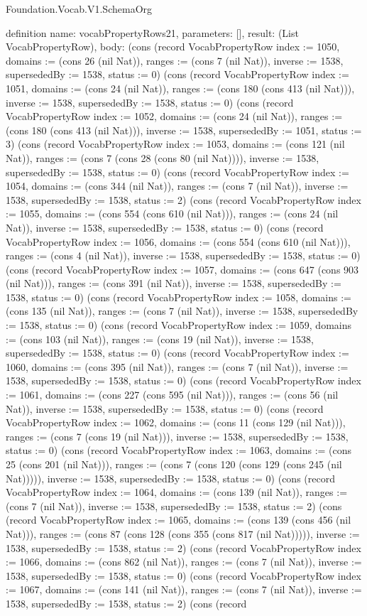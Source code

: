 \begin{lexlean}{Foundation.Vocab.V1.SchemaOrg}
\begin{semanticmodule}
definition{
  name: vocabPropertyRows21,
  parameters: [],
  result: (List VocabPropertyRow),
  body: (cons (record VocabPropertyRow {index := 1050, domains := (cons 26 (nil Nat)), ranges := (cons 7 (nil Nat)), inverse := 1538, supersededBy := 1538, status := 0}) (cons (record VocabPropertyRow {index := 1051, domains := (cons 24 (nil Nat)), ranges := (cons 180 (cons 413 (nil Nat))), inverse := 1538, supersededBy := 1538, status := 0}) (cons (record VocabPropertyRow {index := 1052, domains := (cons 24 (nil Nat)), ranges := (cons 180 (cons 413 (nil Nat))), inverse := 1538, supersededBy := 1051, status := 3}) (cons (record VocabPropertyRow {index := 1053, domains := (cons 121 (nil Nat)), ranges := (cons 7 (cons 28 (cons 80 (nil Nat)))), inverse := 1538, supersededBy := 1538, status := 0}) (cons (record VocabPropertyRow {index := 1054, domains := (cons 344 (nil Nat)), ranges := (cons 7 (nil Nat)), inverse := 1538, supersededBy := 1538, status := 2}) (cons (record VocabPropertyRow {index := 1055, domains := (cons 554 (cons 610 (nil Nat))), ranges := (cons 24 (nil Nat)), inverse := 1538, supersededBy := 1538, status := 0}) (cons (record VocabPropertyRow {index := 1056, domains := (cons 554 (cons 610 (nil Nat))), ranges := (cons 4 (nil Nat)), inverse := 1538, supersededBy := 1538, status := 0}) (cons (record VocabPropertyRow {index := 1057, domains := (cons 647 (cons 903 (nil Nat))), ranges := (cons 391 (nil Nat)), inverse := 1538, supersededBy := 1538, status := 0}) (cons (record VocabPropertyRow {index := 1058, domains := (cons 135 (nil Nat)), ranges := (cons 7 (nil Nat)), inverse := 1538, supersededBy := 1538, status := 0}) (cons (record VocabPropertyRow {index := 1059, domains := (cons 103 (nil Nat)), ranges := (cons 19 (nil Nat)), inverse := 1538, supersededBy := 1538, status := 0}) (cons (record VocabPropertyRow {index := 1060, domains := (cons 395 (nil Nat)), ranges := (cons 7 (nil Nat)), inverse := 1538, supersededBy := 1538, status := 0}) (cons (record VocabPropertyRow {index := 1061, domains := (cons 227 (cons 595 (nil Nat))), ranges := (cons 56 (nil Nat)), inverse := 1538, supersededBy := 1538, status := 0}) (cons (record VocabPropertyRow {index := 1062, domains := (cons 11 (cons 129 (nil Nat))), ranges := (cons 7 (cons 19 (nil Nat))), inverse := 1538, supersededBy := 1538, status := 0}) (cons (record VocabPropertyRow {index := 1063, domains := (cons 25 (cons 201 (nil Nat))), ranges := (cons 7 (cons 120 (cons 129 (cons 245 (nil Nat))))), inverse := 1538, supersededBy := 1538, status := 0}) (cons (record VocabPropertyRow {index := 1064, domains := (cons 139 (nil Nat)), ranges := (cons 7 (nil Nat)), inverse := 1538, supersededBy := 1538, status := 2}) (cons (record VocabPropertyRow {index := 1065, domains := (cons 139 (cons 456 (nil Nat))), ranges := (cons 87 (cons 128 (cons 355 (cons 817 (nil Nat))))), inverse := 1538, supersededBy := 1538, status := 2}) (cons (record VocabPropertyRow {index := 1066, domains := (cons 862 (nil Nat)), ranges := (cons 7 (nil Nat)), inverse := 1538, supersededBy := 1538, status := 0}) (cons (record VocabPropertyRow {index := 1067, domains := (cons 141 (nil Nat)), ranges := (cons 7 (nil Nat)), inverse := 1538, supersededBy := 1538, status := 2}) (cons (record }
\end{semanticmodule}
\end{lexlean}
